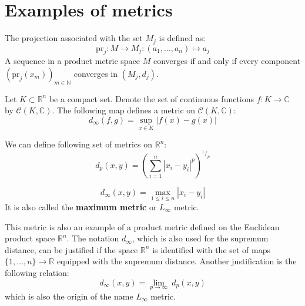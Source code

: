 \section{Examples of metrics}

	\begin{property}
		The projection associated with the set $M_j$ is defined as:
		\begin{equation}
			\label{metric:projection}
			\text{pr}_j:M\rightarrow M_j:(a_1,...,a_n)\mapsto a_j
		\end{equation}
		A sequence in a product metric space $M$ converges if and only if every component $(\text{pr}_j(x_m))_{m\in\mathbb{N}}$ converges in $(M_j, d_j)$.
	\end{property}

	\begin{example}
		Let $K\subset\mathbb{R}^n$ be a compact set. Denote the set of continuous functions $f:K\rightarrow\mathbb{C}$ by $\mathcal{C}(K,\mathbb{C})$. The following map defines a metric on $\mathcal{C}(K,\mathbb{C})$:
		\begin{equation}
			\label{topology:supremum_distance}
			d_\infty(f,g) = \sup_{x\in K}|f(x) - g(x)|
		\end{equation}
	\end{example}

	\begin{example}[p-metric]
		We can define following set of metrics on $\mathbb{R}^n$:
		\begin{equation}
			\label{topology:p_metric}
			\boxed{d_p(x,y) = \left(\sum_{i=1}^n|x_i-y_i|^p\right)^{^1/_p}}
		\end{equation}
	\end{example}
        \begin{example}
		\begin{equation}
        	    	\label{topology:chebyshev_distance}
        	    	d_\infty(x,y) = \max_{1\leq i\leq n}|x_i - y_i|
		\end{equation}
            	It is also called the \textbf{maximum metric} or $L_\infty$ metric.
	\end{example}
        \begin{remark}
        	This metric is also an example of a product metric defined on the Euclidean product space $\mathbb{R}^n$. The notation $d_\infty$, which is also used for the supremum distance, can be justified if the space $\mathbb{R}^n$ is identified with the set of maps $\{1,...,n\}\rightarrow \mathbb{R}$ equipped with the supremum distance. Another justification is the following relation:
		\begin{equation}
			d_\infty(x,y) = \lim_{p\rightarrow\infty}\ d_p(x,y)
		\end{equation}
		which is also the origin of the name $L_\infty$ metric.
        \end{remark}

